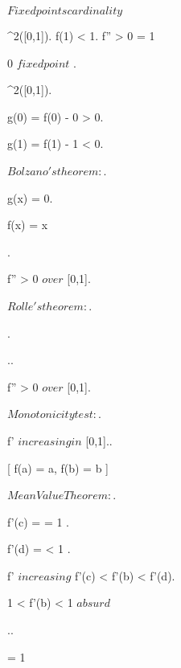 \documentclass[../Main/main]{subfiles}
\begin{document}
\unit{ $ Fixed points cardinality $ }
{
	{
		{
			 \in \Cc^2([0,1]).
			f(1) < 1.
			f'' > 0 \in [0,1]
		}
		\showthat
		{
			 = 1
		}
		\demonstration
		{
			{
				
				{
					0 $ fixed point $
				}.
				{
					 \in \Cc^2([0,1]).

					g(0) = f(0) - 0 > 0.

					g(1) = f(1) - 1 < 0.

					$Bolzano's theorem: $.

					{
						g(x) = 0.

						f(x) = x
					}
				}


			}.
			
			{
				f'' > 0 $ over $ [0,1].

				$Rolle's theorem:$.

				 .

				 ..



				f'' > 0 $ over $ [0,1].

				$Monotonicity test:$.

				f' $ increasing in $ [0,1]..



				\all{ a < b \in [0,1) }[ f(a) = a, f(b) = b ]
				{
					$Mean Value Theorem:$.

					{
						f'(c) =  = 1
					}.

					{
						f'(d) =  < 1
					}.

					f' $ increasing $ \imp f'(c) < f'(b) < f'(d).

					1 < f'(b) < 1 $ absurd $
				}				 

			}..

			\conclude {} = 1

		}
	}
}
\end{document}
